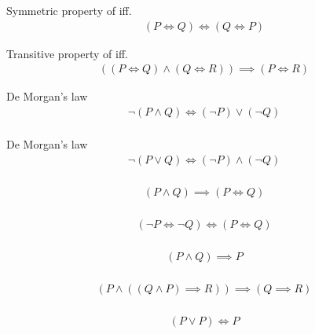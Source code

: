 \begin{prop}
\label{Proposition:iff_symmetric}
Symmetric property of iff.
\begin{align*}
(P \iff Q) \iff (Q \iff P)
\end{align*}
\end{prop}

\begin{prop}
\label{Proposition:iff_transitive}
Transitive property of iff.
\begin{align*}
((P \iff Q) \land (Q \iff R)) \implies (P \iff R)
\end{align*}
\end{prop}

\begin{prop}
\label{Proposition:De_Morgan_1}
De Morgan's law
\begin{align*}
\lnot (P \land Q) \iff (\lnot P) \lor (\lnot Q) \\
\end{align*}
\end{prop}

\begin{prop}
\label{Proposition:De_Morgan_2}
De Morgan's law
\begin{align*}
\lnot (P \lor Q) \iff (\lnot P) \land (\lnot Q) \\
\end{align*}
\end{prop}

\begin{prop}
\label{Proposition:land_implies_iff}
\begin{align*}
(P \land Q) \implies  (P \iff Q) \\
\end{align*}
\end{prop}

\begin{prop}
\label{Proposition:iff_contrapositive}
\begin{align*}
(\lnot P \iff \lnot Q) \iff (P \iff Q) \\
\end{align*}
\end{prop}

\begin{prop}
\label{Proposition:land_omit}
\begin{align*}
(P \land Q) \implies P \\
\end{align*}
\end{prop}

\begin{lemma}
\label{Lemma:uniqueness}
\begin{align*}
(P \land ((Q \land P) \implies R)) \implies (Q \implies R) \\
\end{align*}
\end{lemma}

\begin{prop}
\label{Proposition:lor_itself}
\begin{align*}
(P \lor P) \iff P \\
\end{align*}
\end{prop}